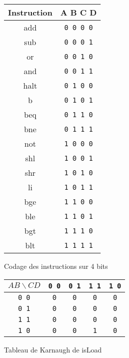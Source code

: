 \documentclass[10pt,a4paper]{article}
\begin{document}
\begin{figure}[h]
\centering
\begin{tabular}{|c|c|}
 \hline
 \textbf{Instruction} & \textbf{A B C D} \\
 \hline
 add & \verb|0 0 0 0| \\
 \hline
 sub & \verb|0 0 0 1| \\
 \hline
 or & \verb|0 0 1 0| \\
 \hline
 and & \verb|0 0 1 1| \\
 \hline
 halt & \verb|0 1 0 0| \\
 \hline
 b & \verb|0 1 0 1| \\
 \hline
 beq & \verb|0 1 1 0| \\
 \hline
 bne & \verb|0 1 1 1| \\
 \hline
 not & \verb|1 0 0 0| \\
 \hline
 shl & \verb|1 0 0 1| \\
 \hline
 shr & \verb|1 0 1 0| \\
 \hline
 li & \verb|1 0 1 1| \\
 \hline
 bge & \verb|1 1 0 0| \\
 \hline
 ble & \verb|1 1 0 1| \\
 \hline
 bgt & \verb|1 1 1 0| \\
 \hline
 blt & \verb|1 1 1 1| \\
 \hline
\end{tabular}
\caption{Codage des instructions sur 4 bits}
\label{codage_instructions}
\end{figure}

\begin{figure}[h]
\centering
\begin{tabular}{|c|c|c|c|c|}
 \hline
 \textbf{$A B \backslash C D$} & \verb|0 0| & \verb|0 1| & \verb|1 1| & \verb|1 0|\\
 \hline
  \verb|0 0| & \verb|0| & \verb|0| & \verb|0| & \verb|0| \\
 \hline
   \verb|0 1| & \verb|0| & \verb|0| & \verb|0| & \verb|0| \\
 \hline
   \verb|1 1| & \verb|0| & \verb|0| & \verb|0| & \verb|0| \\
 \hline
   \verb|1 0| & \verb|0| & \verb|0| & \verb|1| & \verb|0| \\
 \hline
\end{tabular}
\caption{Tableau de Karnaugh de isLoad}
\label{karnaugh_isload}
\end{figure}
\end{document}
